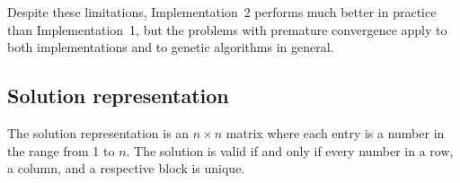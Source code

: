 Despite these limitations, Implementation~2 performs much better in practice than Implementation~1, but the problems with premature convergence apply to both implementations and to genetic algorithms in general.

\subsection{Solution representation}
The solution representation is an $n \times n$ matrix where each entry is a number in the range from 1 to $n$. The solution is valid if and only if every number in a row, a column, and a respective block is unique.